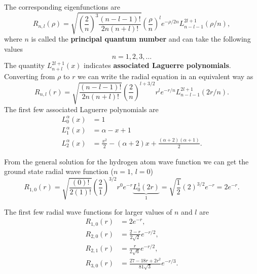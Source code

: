 \documentclass[../Main/chem331-notes.tex]{subfiles}
\begin{document}
The corresponding eigenfunctions are
\begin{equation}
R_{n,l}(\rho) = \sqrt{\left(\frac{2}{n} \right)^{3} \frac{ (n-l-1)! }{ 2n (n+l)!} }\left(\frac{\rho}{n}\right)^l e^{-\rho/2n} L_{n-l-1}^{2l+1}(\rho/n),
\end{equation}
where $n$ is called the \textbf{principal quantum number} and can take the following values
\begin{equation}
n = 1, 2, 3, \ldots
\end{equation}
The quantity $L_{n+l}^{2l+1}(x)$ indicates \textbf{associated Laguerre polynomials}.
Converting from $\rho$ to $r$ we can write the radial equation in an equivalent way as
\begin{equation}
R_{n,l}(r) = \sqrt{\frac{ (n-l-1)! }{ 2n (n+l)!} } \left(\frac{2}{n} \right)^{l + 3/2} r^l e^{-r/n} L_{n-l-1}^{2l+1}(2r/n).
\end{equation}
The first few associated Laguerre polynomials are
\begin{equation}
\begin{split}
L_0^\alpha(x) & = 1 \\
L_1^\alpha(x) & = \alpha - x + 1 \\
L_2^\alpha(x) & = \frac{x^2}{2} - (\alpha + 2) x + \frac{(\alpha + 2)(\alpha + 1)}{2}.
\end{split}
\end{equation}

From the general solution for the hydrogen atom wave function we can get the ground state radial wave function ($n = 1$, $l = 0$)
\begin{equation}
R_{1,0}(r) =
\sqrt{\frac{ (0)! }{ 2 (1)!} } \left(\frac{2}{1} \right)^{3/2} r^0 e^{-r} \underbrace{L_{0}^{1}(2r)}_{1}
= \sqrt{\frac{1}{ 2} } \left(2\right)^{ 3/2} e^{-r} = 2 e^{-r}.
\end{equation}

The first few radial wave functions for larger values of $n$ and $l$ are
\begin{equation}
\begin{split}
R_{1,0}(r) & = 2 e^{-r}, \\
R_{2,0}(r) & =\frac{2 - r}{2 \sqrt{2}} e^{-r/2}, \\
R_{2,1}(r) & =\frac{r}{2 \sqrt{6}} e^{-r/2}, \\
R_{3,0}(r) & =\frac{27 - 18 r + 2 r^2}{81 \sqrt{3}} e^{-r/3}.
\end{split}
\end{equation}
\end{document}
